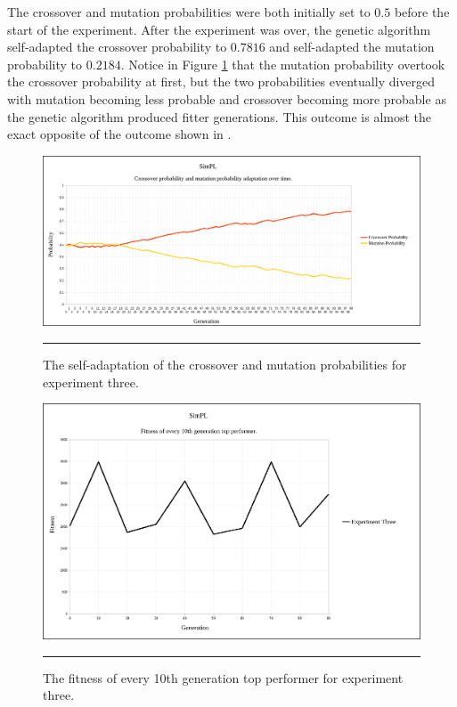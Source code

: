 The crossover and mutation probabilities were both initially set to $0.5$ before the start of the experiment. After the experiment was over, the genetic algorithm self-adapted the crossover probability to $0.7816$ and self-adapted the mutation probability to $0.2184$. Notice in Figure \ref{fig:exp3_self_adapt} that the mutation probability overtook the crossover probability at first, but the two probabilities eventually diverged with mutation becoming less probable and crossover becoming more probable as the genetic algorithm produced fitter generations. This outcome is almost the exact opposite of the outcome shown in \cite{self_adapt}.

\begin{figure}[ht!]  
  \centering
  \includegraphics[width=5in]{../Figures/Chapter3/exp3_self_adapt.png}
  \rule{35em}{0.5pt}
  \caption[Experiment Three Self-adaptation]{The self-adaptation of the crossover and mutation probabilities for experiment three.}
  \label{fig:exp3_self_adapt}
\end{figure}

\begin{figure}[ht!]  
  \centering
  \includegraphics[width=5in]{../Figures/Chapter3/exp3_10_tops.png}
  \rule{35em}{0.5pt}
  \caption[Experiment Three Top Performers]{The fitness of every 10th generation top performer for experiment three.}
  \label{fig:exp3_10_tops}
\end{figure}

